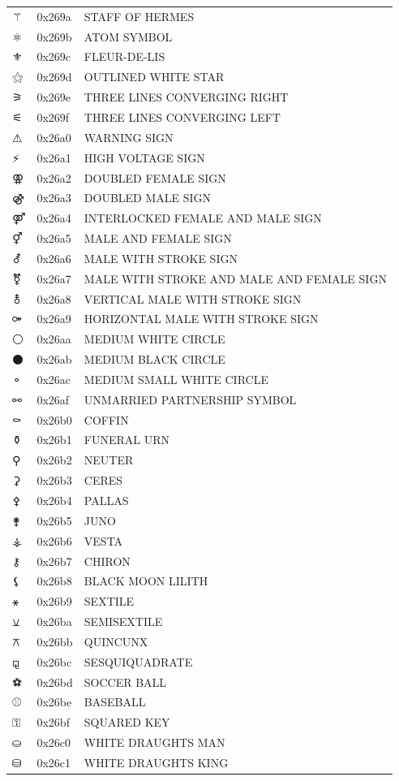 \documentclass[12pt, twoside]{article}
\begin{document}
\begin{longtable}{L{1.0cm} L{2.0cm} >{\footnotesize}L{10cm}}
$⚚$&0x269a&STAFF OF HERMES\\
$⚛$&0x269b&ATOM SYMBOL\\
$⚜$&0x269c&FLEUR-DE-LIS\\
$⚝$&0x269d&OUTLINED WHITE STAR\\
$⚞$&0x269e&THREE LINES CONVERGING RIGHT\\
$⚟$&0x269f&THREE LINES CONVERGING LEFT\\
$⚠$&0x26a0&WARNING SIGN\\
$⚡$&0x26a1&HIGH VOLTAGE SIGN\\
$⚢$&0x26a2&DOUBLED FEMALE SIGN\\
$⚣$&0x26a3&DOUBLED MALE SIGN\\
$⚤$&0x26a4&INTERLOCKED FEMALE AND MALE SIGN\\
$⚥$&0x26a5&MALE AND FEMALE SIGN\\
$⚦$&0x26a6&MALE WITH STROKE SIGN\\
$⚧$&0x26a7&MALE WITH STROKE AND MALE AND FEMALE SIGN\\
$⚨$&0x26a8&VERTICAL MALE WITH STROKE SIGN\\
$⚩$&0x26a9&HORIZONTAL MALE WITH STROKE SIGN\\
$⚪$&0x26aa&MEDIUM WHITE CIRCLE\\
$⚫$&0x26ab&MEDIUM BLACK CIRCLE\\
$⚬$&0x26ac&MEDIUM SMALL WHITE CIRCLE\\
$⚯$&0x26af&UNMARRIED PARTNERSHIP SYMBOL\\
$⚰$&0x26b0&COFFIN\\
$⚱$&0x26b1&FUNERAL URN\\
$⚲$&0x26b2&NEUTER\\
$⚳$&0x26b3&CERES\\
$⚴$&0x26b4&PALLAS\\
$⚵$&0x26b5&JUNO\\
$⚶$&0x26b6&VESTA\\
$⚷$&0x26b7&CHIRON\\
$⚸$&0x26b8&BLACK MOON LILITH\\
$⚹$&0x26b9&SEXTILE\\
$⚺$&0x26ba&SEMISEXTILE\\
$⚻$&0x26bb&QUINCUNX\\
$⚼$&0x26bc&SESQUIQUADRATE\\
$⚽$&0x26bd&SOCCER BALL\\
$⚾$&0x26be&BASEBALL\\
$⚿$&0x26bf&SQUARED KEY\\
$⛀$&0x26c0&WHITE DRAUGHTS MAN\\
$⛁$&0x26c1&WHITE DRAUGHTS KING\\

\end{longtable}
\end{document}

